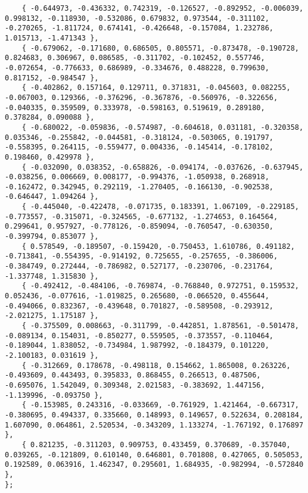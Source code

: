 \documentclass[a4paper]{article}
\begin{document}
\begin{lstlisting}
    { -0.644973, -0.436332, 0.742319, -0.126527, -0.892952, -0.006039, 0.998132, -0.118930, -0.532086, 0.679832, 0.973544, -0.311102, -0.270265, -1.811724, 0.674141, -0.426648, -0.157084, 1.232786, 1.015713, -1.471343 }, 
    { -0.679062, -0.171680, 0.686505, 0.805571, -0.873478, -0.190728, 0.824683, 0.306967, 0.086585, -0.311702, -0.102452, 0.557746, -0.072654, -0.776633, 0.686989, -0.334676, 0.488228, 0.799630, 0.817152, -0.984547 }, 
    { -0.402862, 0.157164, 0.129711, 0.371831, -0.045603, 0.082255, -0.067003, 0.129366, -0.376296, -0.367876, -0.560976, -0.322656, -0.040335, 0.359509, 0.333978, -0.598163, 0.519619, 0.289180, 0.378284, 0.090088 }, 
    { -0.680022, -0.059836, -0.574987, -0.604618, 0.031181, -0.320358, 0.035346, -0.255842, -0.044581, -0.318124, -0.503065, 0.191797, -0.558395, 0.264115, -0.559477, 0.004336, -0.145414, -0.178102, 0.198460, 0.429978 }, 
    { -0.032090, 0.038352, -0.658826, -0.094174, -0.037626, -0.637945, -0.038256, 0.006669, 0.008177, -0.994376, -1.050938, 0.268918, -0.162472, 0.342945, 0.292119, -1.270405, -0.166130, -0.902538, -0.646447, 1.094264 }, 
    { -0.445040, -0.422478, -0.071735, 0.183391, 1.067109, -0.229185, -0.773557, -0.315071, -0.324565, -0.677132, -1.274653, 0.164564, 0.299641, 0.957927, -0.778126, -0.859094, -0.760547, -0.630350, -0.399794, 0.853077 }, 
    { 0.578549, -0.189507, -0.159420, -0.750453, 1.610786, 0.491182, -0.713841, -0.554395, -0.914192, 0.725655, -0.257655, -0.386006, -0.384749, 0.272444, -0.786982, 0.527177, -0.230706, -0.231764, -1.337748, 1.315830 }, 
    { -0.492412, -0.484106, -0.769874, -0.768840, 0.972751, 0.159532, 0.052436, -0.077616, -1.019825, 0.265680, -0.066520, 0.455644, -0.494066, 0.832367, -0.439648, 0.701827, -0.589508, -0.293912, -2.021275, 1.175187 }, 
    { -0.375509, 0.008663, -0.311799, -0.442851, 1.878561, -0.501478, -0.089134, 0.154031, -0.850277, 0.559505, -0.373557, -0.110464, -0.189044, 1.838052, -0.734984, 1.987992, -0.184379, 0.101220, -2.100183, 0.031619 }, 
    { -0.312669, 0.178678, -0.498118, 0.154662, 1.865008, 0.263226, -0.493609, 0.443493, 0.395833, 0.868455, 0.266513, 0.487506, -0.695076, 1.542049, 0.309348, 2.021583, -0.383692, 1.447156, -1.139996, -0.093750 }, 
    { -0.153985, 0.243316, -0.033669, -0.761929, 1.421464, -0.667317, -0.380695, 0.494337, 0.335660, 0.148993, 0.149657, 0.522634, 0.208184, 1.607090, 0.064861, 2.520534, -0.343209, 1.133274, -1.767192, 0.176897 }, 
    { 0.821235, -0.311203, 0.909753, 0.433459, 0.370689, -0.357040, 0.039265, -0.121809, 0.610140, 0.646801, 0.701808, 0.427065, 0.505053, 0.192589, 0.063916, 1.462347, 0.295601, 1.684935, -0.982994, -0.572840 }, 
};


\end{lstlisting}
\end{document}
